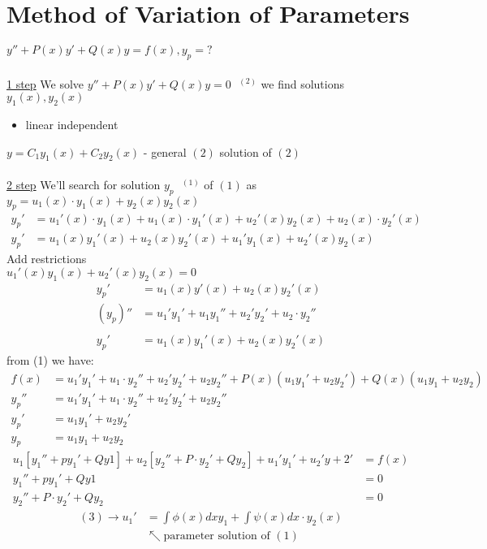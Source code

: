 \documentclass[10pt, letterpaper]{article}
\begin{document}
\section{Method of Variation of Parameters}
$y'' +P(x)y' +Q(x)y =f(x), y_p=?$\\
\\
\underline{1 step} We solve $y'' +P(x)y' +Q(x)y =0~~~^{(2)}$ we find solutions $y_1(x), y_2(x)$
\begin{itemize}
	\item linear independent
\end{itemize}
$y =C_1y_1(x) +C_2y_2(x)$ - general $(2)$ solution of $(2)$\\
\\
\underline{2 step} We'll search for solution $y_p~~~^{(1)}$ of $(1)$ as $y_p=u_1(x)\cdot y_1(x) +y_2(x)y_2(x)$
\begin{align*}
y_p' &= u_1'(x) \cdot y_1(x) +u_1(x) \cdot y_1'(x) +u_2'(x)y_2(x) +u_2(x) \cdot y_2'(x)\\
y_p' &= u_1(x)y_1'(x) +u_2(x)y_2'(x) +u_1'y_1(x) +u_2'(x)y_2(x)
\end{align*}
Add restrictions\\
$u_1'(x) y_1(x) + u_2'(x)y_2(x)=0$\\
\begin{align*}
y_p' &= u_1(x)y'(x) +u_2(x)y_2'(x)\\
(y_p)'' &= u_1'y_1' +u_1y_1'' +u_2'y_2' +u_2 \cdot y_2''\\
\\
y_p' &= u_1(x)y_1'(x) +u_2(x)y_2'(x)
\end{align*}
from (1) we have:
\begin{align*}
f(x) &= u_1'y_1' +u_1 \cdot y_2'' +u_2'y_2' +u_2y_2'' +P(x)(u_1y_1' +u_2y_2') +Q(x)(u_1y_1 +u_2y_2)\\
y_p'' &= u_1'y_1' +u_1 \cdot y_2'' +u_2'y_2' +u_2y_2''\\
y_p' &= u_1y_1' +u_2y_2'\\
y_p &= u_1y_1 +u_2y_2
\end{align*}
\begin{align*}
u_1[y_1'' +py_1' +Qy1] +u_2[y_2'' +P \cdot y_2' +Qy_2] +u_1'y_1' +u_2'y+2' &= f(x)\\
y_1'' +py_1' +Qy1 &= 0\\
y_2'' +P \cdot y_2' +Qy_2 &= 0
\end{align*}
\begin{align*}
(3) \rightarrow u_1' &= \int \limits \phi(x)dxy_1 +\int \limits \psi(x)dx \cdot y_2(x)\\
&\nwarrow \text{parameter solution of }(1)
\end{align*}
\end{document}
